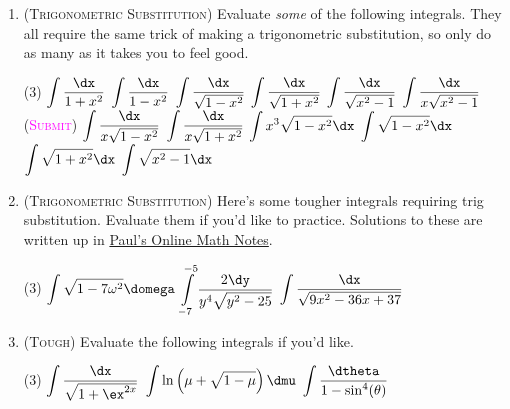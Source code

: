 \begin{enumerate}
    \item 
        (\textsc{Trigonometric Substitution})
        Evaluate \emph{some} of the following integrals.
        They all require the same trick of making a trigonometric substitution,
        so only do as many as it takes you to feel good. 
        \begin{tasks}[after-item-skip=2ex](3)
            \task $\displaystyle\int \frac{\dx}{1+x^2}$
            \task $\displaystyle\int \frac{\dx}{1-x^2}$
            \task $\displaystyle\int \frac{\dx}{\sqrt{1-x^2}}$
            \task $\displaystyle\int \frac{\dx}{\sqrt{1+x^2}}$
            \task $\displaystyle\int \frac{\dx}{\sqrt{x^2-1}}$
            \task $\displaystyle\int \frac{\dx}{x\sqrt{x^2-1}}$
            (\textsc{\textcolor{magenta}{Submit}})
            \task $\displaystyle\int \frac{\dx}{x\sqrt{1-x^2}}$
            \task $\displaystyle\int \frac{\dx}{x\sqrt{1+x^2}}$
            \task $\displaystyle\int x^3\sqrt{1-x^2}\dx$
            \task $\displaystyle\int \sqrt{1-x^2}\dx$ 
            \task $\displaystyle\int \sqrt{1+x^2}\dx$
            \task $\displaystyle\int \sqrt{x^2-1}\dx$
        \end{tasks}

    \item 
        (\textsc{Trigonometric Substitution})
        Here's some tougher integrals requiring trig substitution. 
        Evaluate them if you'd like to practice. 
        Solutions to these are written up in
        \href{http://tutorial.math.lamar.edu/Problems/CalcII/TrigSubstitutions.aspx}%
        {Paul's Online Math Notes}.
        \begin{tasks}[after-item-skip=2ex](3)
            \task $\displaystyle\int \sqrt{1-7\omega^2} \domega$
            \task $\displaystyle\int\limits_{-7}^{-5} \frac{2\dy}{y^4\sqrt{y^2-25}}$
            \task $\displaystyle\int \frac{\dx}{\sqrt{9x^2-36x+37}} $
        \end{tasks}

    \item 
        (\textsc{Tough})
        Evaluate the following integrals if you'd like.
        \begin{tasks}(3)
            \task $\displaystyle\int\limits \frac{\dx}{\sqrt{1+\ex^{2x}}}$
            \task $\displaystyle\int\limits \ln\left(\mu + \sqrt{1-\mu}\right)\dmu$
            \task $\displaystyle\int\limits \frac{\dtheta}{1-\sin^4(\theta)}$
        \end{tasks}

\end{enumerate}

